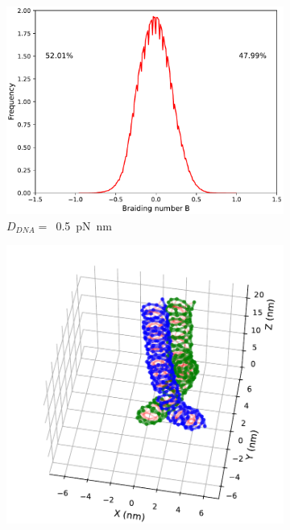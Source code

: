 \documentclass[a4paper,10pt]{article}
\begin{document}
\begin{figure}[tb]
\begin{subfigure}{.3\textwidth}
\includegraphics[width=\textwidth]{brD_5_br_pr.pdf}
\caption{$D_{DNA}=$~\SI{0.5}{\pico\newton\nano\meter}}
\label{fig:braD_a}
\end{subfigure}
\begin{subfigure}{.3\textwidth}
\includegraphics[width=\textwidth]{brD_100_2000000.pdf}

\end{subfigure}
\end{figure}
\end{document}
